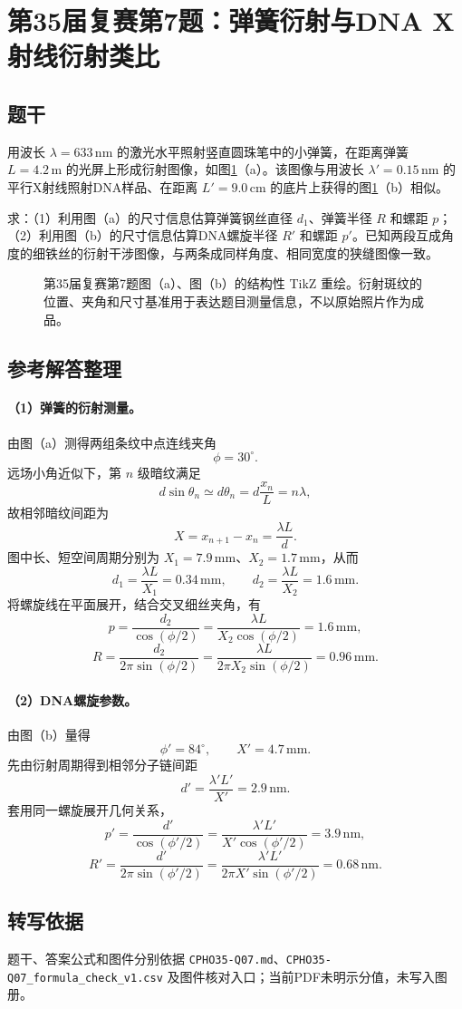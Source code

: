 \section{第35届复赛第7题：弹簧衍射与DNA X射线衍射类比}
\subsection{题干}
用波长 $\lambda=633\,\mathrm{nm}$ 的激光水平照射竖直圆珠笔中的小弹簧，在距离弹簧 $L=4.2\,\mathrm m$ 的光屏上形成衍射图像，如图\ref{fig:cpho35q07}（a）。该图像与用波长 $\lambda'=0.15\,\mathrm{nm}$ 的平行X射线照射DNA样品、在距离 $L'=9.0\,\mathrm{cm}$ 的底片上获得的图\ref{fig:cpho35q07}（b）相似。

求：（1）利用图（a）的尺寸信息估算弹簧钢丝直径 $d_1$、弹簧半径 $R$ 和螺距 $p$；（2）利用图（b）的尺寸信息估算DNA螺旋半径 $R'$ 和螺距 $p'$。已知两段互成角度的细铁丝的衍射干涉图像，与两条成同样角度、相同宽度的狭缝图像一致。
\begin{figure}[htbp]\centering

\caption{第35届复赛第7题图（a）、图（b）的结构性 TikZ 重绘。衍射斑纹的位置、夹角和尺寸基准用于表达题目测量信息，不以原始照片作为成品。}\label{fig:cpho35q07}
\end{figure}

\subsection{参考解答整理}
\paragraph{（1）弹簧的衍射测量。} 由图（a）测得两组条纹中点连线夹角
\[
\phi=30^\circ.
\]
远场小角近似下，第 $n$ 级暗纹满足
\[
d\sin\theta_n\simeq d\theta_n=d\frac{x_n}{L}=n\lambda,
\]
故相邻暗纹间距为
\[
X=x_{n+1}-x_n=\frac{\lambda L}{d}.
\]
图中长、短空间周期分别为 $X_1=7.9\,\mathrm{mm}$、$X_2=1.7\,\mathrm{mm}$，从而
\[
d_1=\frac{\lambda L}{X_1}=\boxed{0.34\,\mathrm{mm}},\qquad
d_2=\frac{\lambda L}{X_2}=\boxed{1.6\,\mathrm{mm}}.
\]
将螺旋线在平面展开，结合交叉细丝夹角，有
\[
p=\frac{d_2}{\cos(\phi/2)}
=\frac{\lambda L}{X_2\cos(\phi/2)}
=\boxed{1.6\,\mathrm{mm}},
\]
\[
R=\frac{d_2}{2\pi\sin(\phi/2)}
=\frac{\lambda L}{2\pi X_2\sin(\phi/2)}
=\boxed{0.96\,\mathrm{mm}}.
\]

\paragraph{（2）DNA螺旋参数。} 由图（b）量得
\[
\phi'=84^\circ,\qquad X'=4.7\,\mathrm{mm}.
\]
先由衍射周期得到相邻分子链间距
\[
d'=\frac{\lambda'L'}{X'}=\boxed{2.9\,\mathrm{nm}}.
\]
套用同一螺旋展开几何关系，
\[
p'=\frac{d'}{\cos(\phi'/2)}
=\frac{\lambda'L'}{X'\cos(\phi'/2)}
=\boxed{3.9\,\mathrm{nm}},
\]
\[
R'=\frac{d'}{2\pi\sin(\phi'/2)}
=\frac{\lambda'L'}{2\pi X'\sin(\phi'/2)}
=\boxed{0.68\,\mathrm{nm}}.
\]

\subsection{转写依据}
题干、答案公式和图件分别依据 \texttt{CPHO35-Q07.md}、\texttt{CPHO35-Q07\_formula\_check\_v1.csv} 及图件核对入口；当前PDF未明示分值，未写入图册。
